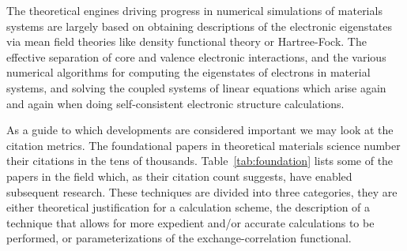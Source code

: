 The theoretical engines driving progress in numerical simulations of materials systems are
largely based on obtaining descriptions of the electronic eigenstates via mean field theories
like density functional theory or Hartree-Fock. The effective separation
of core and valence electronic interactions, and the various numerical algorithms for 
computing the eigenstates of electrons in material systems, 
and solving the coupled systems of linear equations which arise 
again and again when doing self-consistent electronic structure calculations.

As a guide to which developments are considered important we may
look at the citation metrics. The foundational papers in theoretical materials science
number their citations in the tens of thousands. Table~\ref{tab:foundation} lists some of the papers in the field which, as
their citation count suggests, have enabled subsequent research. These techniques are divided into
three categories, they are either theoretical justification for a calculation scheme, the description of
a technique that allows for more expedient and/or accurate calculations to be performed, 
or parameterizations of the exchange-correlation functional.

